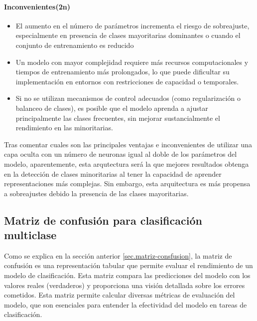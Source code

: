 \paragraph{Inconvenientes(2n)}
\begin{itemize}
	\item El aumento en el número de parámetros incrementa el riesgo de sobreajuste, especialmente en presencia de clases mayoritarias dominantes o cuando el conjunto de entrenamiento es reducido
	\item Un modelo con mayor complejidad requiere más recursos computacionales y tiempos de entrenamiento más prolongados, lo que puede dificultar su implementación en entornos con restricciones de capacidad o temporales.
	\item Si no se utilizan mecanismos de control adecuados (como regularización o balanceo de clases), es posible que el modelo aprenda a ajustar principalmente las clases frecuentes, sin mejorar sustancialmente el rendimiento en las minoritarias.

\end{itemize}

Tras comentar cuales son las principales ventajas e inconvenientes de utilizar una capa oculta con un número de neuronas igual al doble de los parámetros del modelo, aparentemente, esta arqutectura será la que mejores resultados obtenga en la detección de clases minoritarias al tener la capacidad de aprender representaciones más complejas. Sin embargo, esta arquitectura es más propensa a sobreajustes debido la presencia de las clases mayoritarias.


\subsection{Matriz de confusión para clasificación multiclase} \label{sec.matriz-consfusion-multi}

Como se explica en la sección anterior \ref{sec.matriz-consfusion}, la matriz de confusión es una representación tabular que permite evaluar el rendimiento de un modelo de clasificación. Esta matriz compara las predicciones del modelo con los valores reales (verdaderos) y proporciona una visión detallada sobre los errores cometidos. Esta matriz permite calcular diversas métricas de evaluación del modelo, que son esenciales para entender la efectividad del modelo en tareas de clasificación.


